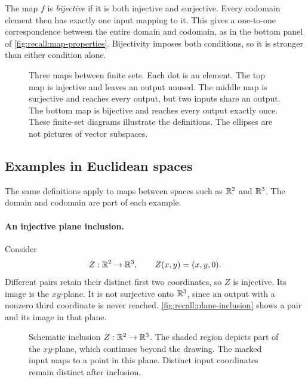 The map \(f\) is \emph{bijective} if it is both injective and surjective.
Every codomain element then has exactly one input mapping to it.
This gives a one-to-one correspondence between the entire domain
and codomain, as in the bottom panel of
\autoref{fig:recall:map-properties}. Bijectivity imposes both
conditions, so it is stronger than either condition alone.

\begin{figure}[htbp]
  \centering
  
  \caption[Injective, surjective, and bijective maps]{Three maps between finite sets. Each dot is an element.
    The top map is injective and leaves an output unused.
    The middle map is surjective and reaches every output, but two inputs
    share an output. The bottom map is bijective and reaches every output
    exactly once.
    These finite-set diagrams illustrate the definitions. The ellipses
    are not pictures of vector subspaces.}
  \label{fig:recall:map-properties}
\end{figure}

\subsection{Examples in Euclidean spaces}

The same definitions apply to maps between spaces such as \(\mathbb{R}^2\)
and \(\mathbb{R}^3\). The domain and codomain are part of each example.

\paragraph{An injective plane inclusion.}
Consider
\[
  Z:\mathbb{R}^2\to\mathbb{R}^3,\qquad Z(x,y)=(x,y,0).
\]
Different pairs retain their distinct first two coordinates, so \(Z\)
is injective. Its image is the \(xy\)-plane. It is not surjective onto
\(\mathbb{R}^3\), since an output with a nonzero third coordinate is never reached.
\autoref{fig:recall:plane-inclusion} shows a pair and its image in that
plane.

\begin{figure}[htbp]
  \centering
  
  \caption[Plane inclusion into three-dimensional space]{Schematic inclusion \(Z:\mathbb{R}^2\to\mathbb{R}^3\). The shaded region
    depicts part of the \(xy\)-plane, which continues beyond the drawing.
    The marked input maps to a point in this plane. Distinct input
    coordinates remain distinct after inclusion.}
  \label{fig:recall:plane-inclusion}
\end{figure}

